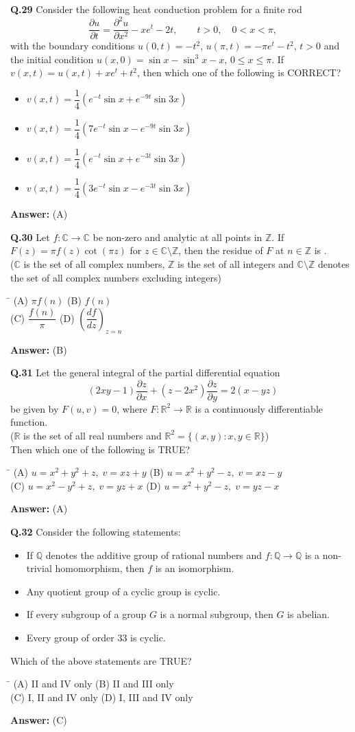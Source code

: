 \documentclass[11pt,a4paper]{article}
\newcommand{\optsfourA}[4]{%
  \begin{tabbing}
    \hspace{0.48\linewidth}\=\kill
    (A) #1 \> (B) #2 \\[2pt]
    (C) #3 \> (D) #4
  \end{tabbing}%
}
\newcommand{\optslistA}[4]{%
  \begin{itemize}
    \setlength{\itemsep}{2pt}\setlength{\parskip}{0pt}
    \item[(A)] #1
    \item[(B)] #2
    \item[(C)] #3
    \item[(D)] #4
  \end{itemize}%
}
\newcommand{\ans}[1]{\textbf{Answer:} #1\par\medskip}
\begin{document}
\textbf{Q.29} Consider the following heat conduction problem for a finite rod
\[
  \frac{\partial u}{\partial t} = \frac{\partial^2 u}{\partial x^2} - x e^t - 2t, \qquad t > 0,\quad 0 < x < \pi,
\]
with the boundary conditions $u(0, t) = -t^2$, $u(\pi, t) = -\pi e^t - t^2$, $t > 0$ and the initial condition $u(x, 0) = \sin x - \sin^3 x - x$, $0 \le x \le \pi$. If $v(x, t) = u(x, t) + x e^t + t^2$, then which one of the following is CORRECT?
\optslistA{$v(x, t) = \dfrac{1}{4}\left(e^{-t}\sin x + e^{-9t}\sin 3x\right)$}{$v(x, t) = \dfrac{1}{4}\left(7e^{-t}\sin x - e^{-9t}\sin 3x\right)$}{$v(x, t) = \dfrac{1}{4}\left(e^{-t}\sin x + e^{-3t}\sin 3x\right)$}{$v(x, t) = \dfrac{1}{4}\left(3e^{-t}\sin x - e^{-3t}\sin 3x\right)$}
\ans{(A)}

\textbf{Q.30} Let $f : \mathbb{C} \to \mathbb{C}$ be non-zero and analytic at all points in $\mathbb{Z}$. If $F(z) = \pi f(z) \cot(\pi z)$ for $z \in \mathbb{C} \setminus \mathbb{Z}$, then the residue of $F$ at $n \in \mathbb{Z}$ is \underline{\hspace{1.8cm}}.\\
($\mathbb{C}$ is the set of all complex numbers, $\mathbb{Z}$ is the set of all integers and $\mathbb{C} \setminus \mathbb{Z}$ denotes the set of all complex numbers excluding integers)
\optsfourA{$\pi f(n)$}{$f(n)$}{$\dfrac{f(n)}{\pi}$}{$\left(\dfrac{df}{dz}\right)_{z=n}$}
\ans{(B)}

\textbf{Q.31} Let the general integral of the partial differential equation
\[
  (2xy - 1)\frac{\partial z}{\partial x} + (z - 2x^2)\frac{\partial z}{\partial y} = 2(x - yz)
\]
be given by $F(u, v) = 0$, where $F : \mathbb{R}^2 \to \mathbb{R}$ is a continuously differentiable function.\\
($\mathbb{R}$ is the set of all real numbers and $\mathbb{R}^2 = \{(x, y) : x, y \in \mathbb{R}\}$)\\
Then which one of the following is TRUE?
\optsfourA{$u = x^2 + y^2 + z,\; v = xz + y$}{$u = x^2 + y^2 - z,\; v = xz - y$}{$u = x^2 - y^2 + z,\; v = yz + x$}{$u = x^2 + y^2 - z,\; v = yz - x$}
\ans{(A)}

\textbf{Q.32} Consider the following statements:
\begin{itemize}
  \setlength{\itemsep}{1pt}\setlength{\parskip}{0pt}
  \item[I.] If $\mathbb{Q}$ denotes the additive group of rational numbers and $f : \mathbb{Q} \to \mathbb{Q}$ is a non-trivial homomorphism, then $f$ is an isomorphism.
  \item[II.] Any quotient group of a cyclic group is cyclic.
  \item[III.] If every subgroup of a group $G$ is a normal subgroup, then $G$ is abelian.
  \item[IV.] Every group of order $33$ is cyclic.
\end{itemize}
Which of the above statements are TRUE?
\optsfourA{II and IV only}{II and III only}{I, II and IV only}{I, III and IV only}
\ans{(C)}
\end{document}
